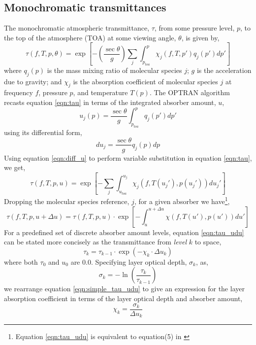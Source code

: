 \subsection{Monochromatic transmittances}
The monochromatic atmospheric transmittance, $\tau$, from some pressure level, $p$, to the top of the atmosphere (TOA) at some viewing angle, $\theta$, is given by,
\begin{equation}
  \tau(f,T,p,\theta) = \exp\left[-\left(\frac{\sec\theta}{g}\right)\sum_{j}\int_{p_{toa}}^{p}\chi_{j}(f,T,p') q_{j}(p')dp'\right]
  \label{eqn:tau}
\end{equation}
where $q_{j}(p)$ is the mass mixing ratio of molecular species $j$; $g$ is the acceleration due to gravity; and $\chi_{j}$ is the absorption coefficient of molecular species $j$ at frequency $f$, pressure $p$, and temperature $T(p)$. The OPTRAN algorithm\cite{ref:optran3} recasts equation \ref{eqn:tau} in terms of the integrated absorber amount, $u$,
\begin{equation}
  u_{j}(p) = \frac{\sec\theta}{g}\int_{p_{toa}}^{p}q_{j}(p')dp'
  \label{eqn:int_u}
\end{equation}
using its differential form,
\begin{equation}
  du_{j} = \frac{\sec\theta}{g}q_{j}(p)dp
  \label{eqn:diff_u}
\end{equation}
Using equation \ref{eqn:diff_u} to perform variable substitution in equation \ref{eqn:tau}, we get,
\begin{equation}
  \tau(f,T,p,u) = \exp\left[-\sum_{j}\int_{u_{toa}}^{u_{j}}\chi_{j}(f,T(u_{j}'),p(u_{j}'))du_{j}'\right]
  \label{eqn:tau_u}
\end{equation}
Dropping the molecular species reference, $j$, for a given absorber we have\footnote{Equation \ref{eqn:tau_udu} is equivalent to equation(5) in \cite{ref:optran3}},
\begin{equation}
  \tau(f,T,p,u+\Delta{u}) = \tau(f,T,p,u)\cdot\exp\left[-\int_{u}^{u+\Delta{u}}\chi(f,T(u'),p(u'))du'\right]
  \label{eqn:tau_udu}
\end{equation}
For a predefined set of discrete absorber amount levels, equation \ref{eqn:tau_udu} can be stated more concisely as the transmittance from \emph{level} $k$ to space,
\begin{equation}
  \tau_{k} = \tau_{k-1}\cdot\exp(-\chi_{k}\cdot\Delta{u}_{k})
  \label{eqn:simple_tau_udu}
\end{equation}
where both $\tau_{0}$ and $u_{0}$ are 0.0. Specifying layer optical depth, $\sigma_{k}$, as,
\begin{equation}
  \sigma_{k} = -\ln\left(\frac{\tau_{k}}{\tau_{k-1}}\right)
  \label{eqn:layer_od}
\end{equation}
we rearrange equation \ref{eqn:simple_tau_udu} to give an expression for the layer absorption coefficient in terms of the layer optical depth and absorber amount,
\begin{equation}
  \chi_{k} = \frac{\sigma_{k}}{\Delta{u}_{k}}
  \label{eqn:layer_chi}
\end{equation}



